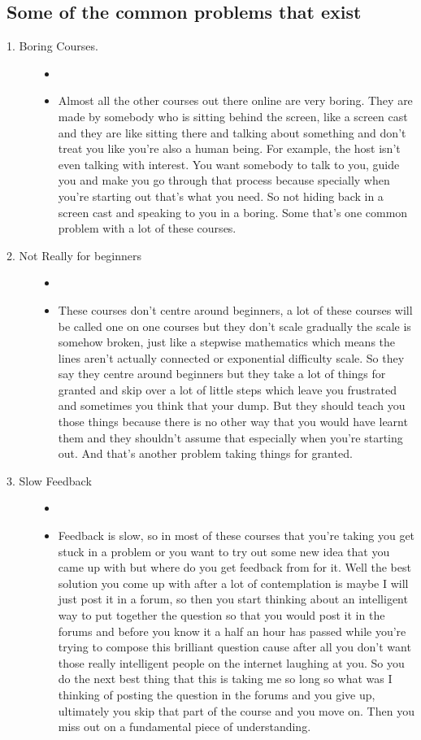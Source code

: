 \documentclass{article}
\begin{document}
\subsection{ Some of the common problems that exist}
\begin{description}
\item[1.	Boring Courses. ]
\begin{itemize}
 \item[]  
 \item 
Almost all the other courses out there online are very boring. They are made by somebody who is sitting behind the screen, like a screen cast and they are like sitting there and talking about something and don’t treat you like you’re also a human being. For example, the host isn’t even talking with interest. You want somebody to talk to you, guide you and make you go through that process because specially when you’re starting out that’s what you need. So not hiding back in a screen cast and speaking to you in a boring. Some that’s one common problem with a lot of these courses. 
 \end{itemize}
\item[2.	Not Really for beginners]
\begin{itemize}
 \item[] 
\item
These courses don’t centre around beginners, a lot of these courses will be called one on one courses but they don’t scale gradually the scale is somehow broken, just like a stepwise mathematics which means the lines aren’t actually connected or exponential difficulty scale. So they say they centre around beginners but they take a lot of things for granted and skip over a lot of little steps which leave you frustrated and sometimes you think that your dump. But they should teach you those things because there is no other way that you would have learnt them and they shouldn’t assume that especially when you’re starting out. And that’s another problem taking things for granted.
\end{itemize}
\item[3.	Slow Feedback]
\begin{itemize}
\item []
\item
Feedback is slow, so in most of these courses that you’re taking you get stuck in a problem or you want to try out some new idea that you came up with but where do you get feedback from for it. Well the best solution you come up with after a lot of contemplation is maybe I will just post it in a forum, so then you start thinking about an intelligent way to put together the question so that you would post it in the forums and before you know it a half an hour has passed while you’re trying to compose this brilliant question cause after all you don’t want those really intelligent people on the internet laughing at you. So you do the next best thing that this is taking me so long so what was I thinking of posting the question in the forums and you give up, ultimately you skip that part of the course and you move on. Then you miss out on a fundamental piece of understanding.
\end{itemize}
\end{description}  
\end{document}

